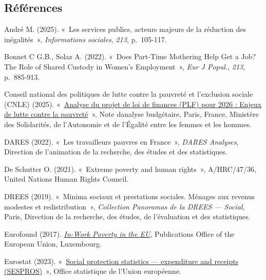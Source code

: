 \documentclass[
  french,
  9pt,
  a4paper,
]{article}
\newlength{\cslhangindent}
\newenvironment{CSLReferences}[2] %
 {\begin{list}{}{%
  \setlength{\itemindent}{0pt}
  \setlength{\leftmargin}{0pt}
  \setlength{\parsep}{0pt}
  \ifodd #1
   \setlength{\leftmargin}{\cslhangindent}
   \setlength{\itemindent}{-1\cslhangindent}
  \fi
  \setlength{\itemsep}{#2\baselineskip}}}
 {\end{list}}
\renewenvironment{CSLReferences}[2] %
    {\begin{list}{}{%
          \setlength{\itemindent}{0pt}
          \setlength{\leftmargin}{0pt}
          \setlength{\parsep}{0pt}
          \ifodd #1
          \setlength{\leftmargin}{\cslhangindent}
          \setlength{\itemindent}{-1\cslhangindent}
          \fi
          \setlength{\itemsep}{0.25\baselineskip}}} %
    {\end{list}}
\begin{document}
\subsection*{Références}\label{ruxe9fuxe9rences}

\label{refs}
\begin{CSLReferences}{0}{1}
André M. (2025). {«~Les services publics, acteurs majeurs de la
réduction des inégalités~»}, \emph{Informations sociales}, \emph{213},
p.~105‑117.

Bonnet C G.B., Solaz A. (2022). {«~Does Part-Time Mothering Help Get a
Job? The Role of Shared Custody in Women's Employment~»}, \emph{Eur J
Popul.}, \emph{213}, p.~885‑913.

Conseil national des politiques de lutte contre la pauvreté et
l'exclusion sociale (CNLE) (2025).
{«~\href{https://solidarites.gouv.fr/sites/solidarite/files/2025-12/CNLE-note-budget-PLF-2026.pdf}{Analyse
du projet de loi de finances (PLF) pour 2026 : Enjeux de lutte contre la
pauvreté}~»}, Note d\textquotesingle analyse budgétaire, Paris, France,
Ministère des Solidarités, de l'Autonomie et de l'Égalité entre les
femmes et les hommes.

DARES (2022). {«~Les travailleurs pauvres en France~»}, \emph{DARES
Analyses}, Direction de l'animation de la recherche, des études et des
statistiques.

De Schutter O. (2021). {«~Extreme poverty and human rights~»},
A/HRC/47/36, United Nations Human Rights Council.

DREES (2019). {«~Minima sociaux et prestations sociales. Ménages aux
revenus modestes et redistribution~»}, \emph{Collection Panoramas de la
DREES --- Social}, Paris, Direction de la recherche, des études, de
l'évaluation et des statistiques.

Eurofound (2017).
\emph{\href{https://www.eurofound.europa.eu/publications/report/2017/in-work-poverty-in-the-eu}{In-Work
Poverty in the EU}}, Publications Office of the European Union,
Luxembourg.

Eurostat (2023).
{«~\href{https://ec.europa.eu/eurostat/statistics-explained/index.php?title=Social_protection_statistics_-_expenditure_and_receipts}{Social
protection statistics --- expenditure and receipts (SESPROS)}~»}, Office
statistique de l'Union européenne.


\end{CSLReferences}
\end{document}
